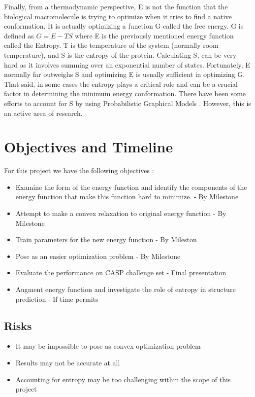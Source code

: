 \documentclass{article} %
\begin{document}
Finally, from a thermodynamic perspective, E is not the function that the biological macromolecule is trying to optimize when it tries to find a native conformation. It is actually optimizing a function G called the free energy. G is defined as $G = E - TS$ where E is the previously mentioned energy function called the Entropy. T is the temperature of the system (normally room temperature), and S is the entropy of the protein. Calculating S, can be very hard as it involves summing over an exponential number of states. Fortunately, E normally far outweighs S and optimizing E is usually sufficient in optimizing G. That said, in some cases the entropy plays a critical role  and can be a crucial factor in determining the minimum energy conformation. There have been some efforts to account for S by using Probabilistic Graphical Models \cite{Hetu2011}. However, this is an active area of research.

\section{Objectives and Timeline}
For this project we have the following objectives : 

\begin{itemize}
\item Examine the form of the energy function and identify the components of the energy function that make this function hard to minimize. - By Milestone
\item Attempt to make a convex relaxation to original energy function - By Milestone
\item Train parameters for the new energy function - By Mileston
\item Pose as an easier optimization problem - By Milestone
\item Evaluate the performance on CASP challenge set - Final presentation
\item Augment energy function and investigate the role of entropy in structure prediction - If time permits
\end{itemize}

\subsection{Risks}
\begin{itemize}
\item It may be impossible to pose as convex optimization problem
\item Results may not be accurate at all
\item Accounting for entropy may be too challenging within the scope of this project
\end{itemize}
\end{document}
